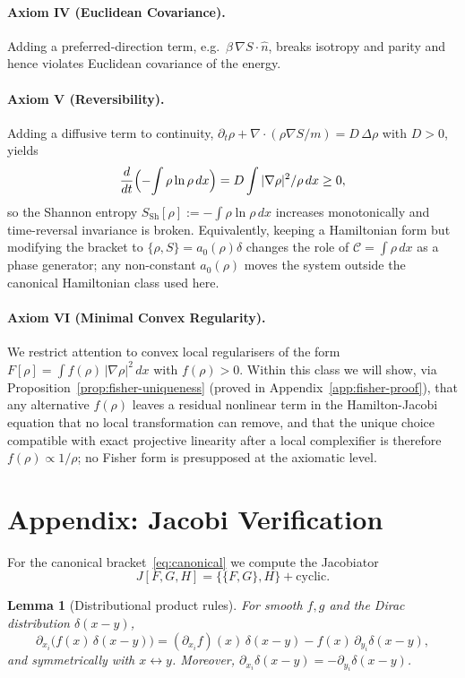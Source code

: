 \documentclass[11pt,a4paper]{article}
\numberwithin{equation}{section}
\theoremstyle{thmcompact}
\newtheorem{lemma}[theorem]{Lemma}
\theoremstyle{remark}
\begin{document}
\paragraph{Axiom IV (Euclidean Covariance).}
Adding a preferred-direction term, e.g.\ $\beta\,\nabla S\!\cdot\!\hat n$,
breaks isotropy and parity and hence violates Euclidean covariance of the energy.
	
\paragraph{Axiom V (Reversibility).}
Adding a diffusive term to continuity, $\partial_t\rho+\nabla\!\cdot(\rho\nabla S/m)=D\,\Delta\rho$ with $D>0$, yields
\[
\frac{d}{dt}\Bigl(-\!\int \rho\ln\rho\,dx\Bigr)
= D\int |\nabla\rho|^{2}/\rho\,dx \ge 0,
\]
so the Shannon entropy $S_{\mathrm{Sh}}[\rho]:=-\int \rho\ln\rho\,dx$ increases monotonically and time-reversal invariance is broken. Equivalently, keeping a Hamiltonian form but modifying the bracket to $\{\rho,S\}=a_{0}(\rho)\delta$ changes the role of $\mathcal C=\!\int\rho\,dx$ as a phase generator; any non-constant $a_0(\rho)$ moves the system outside the canonical Hamiltonian class used here.
	
\paragraph{Axiom VI (Minimal Convex Regularity).}
We restrict attention to convex local regularisers of the form
\(F[\rho]=\int f(\rho)\,|\nabla\rho|^{2}\,dx\) with \(f(\rho)>0\).
Within this class we will show, via Proposition~\ref{prop:fisher-uniqueness}
(proved in Appendix~\ref{app:fisher-proof}), that any alternative \(f(\rho)\)
leaves a residual nonlinear term in the Hamilton-Jacobi equation that no local
transformation can remove, and that the unique choice compatible with exact
projective linearity after a local complexifier is therefore \(f(\rho)\propto 1/\rho\);
no Fisher form is presupposed at the axiomatic level.
	
		\section{Appendix: Jacobi Verification}
	\label{app:jacobi}
	For the canonical bracket~\eqref{eq:canonical} we compute the Jacobiator
	\[
	J[F,G,H]=\{\{F,G\},H\}+\mathrm{cyclic}.
	\]
	
	\begin{lemma}[Distributional product rules]
		For smooth $f,g$ and the Dirac distribution $\delta(x-y)$,
		\[
		\partial_{x_i}\!\big(f(x)\,\delta(x-y)\big)
		=(\partial_{x_i}f)(x)\,\delta(x-y)-f(x)\,\partial_{y_i}\delta(x-y),
		\]
		and symmetrically with $x\leftrightarrow y$. Moreover,
		$\partial_{x_i}\delta(x-y)=-\partial_{y_i}\delta(x-y)$.
	\end{lemma}
	
\end{document}
